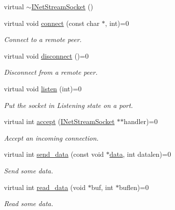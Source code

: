 \begin{DoxyCompactItemize}
\item 
virtual \hyperlink{structINetStreamSocket_a0eba64b33fce654161af0d798d821cf3}{$\sim$\+I\+Net\+Stream\+Socket} ()
\item 
virtual void \hyperlink{structINetStreamSocket_a9efb75e90465e3b182b21fb3ab856415}{connect} (const char $\ast$, int)=0
\begin{DoxyCompactList}\small\item\em Connect to a remote peer. \end{DoxyCompactList}\item 
virtual void \hyperlink{structINetStreamSocket_a902ff1a4caaab6e819e4bfae667a2108}{disconnect} ()=0
\begin{DoxyCompactList}\small\item\em Disconnect from a remote peer. \end{DoxyCompactList}\item 
virtual void \hyperlink{structINetStreamSocket_abbbe6a0061c5fcd1c5e223e2be3917ba}{listen} (int)=0
\begin{DoxyCompactList}\small\item\em Put the socket in Listening state on a port. \end{DoxyCompactList}\item 
virtual int \hyperlink{structINetStreamSocket_af2bd0b33de3a8a30f539eda297786188}{accept} (\hyperlink{structINetStreamSocket}{I\+Net\+Stream\+Socket} $\ast$$\ast$handler)=0
\begin{DoxyCompactList}\small\item\em Accept an incoming connection. \end{DoxyCompactList}\item 
virtual int \hyperlink{structINetStreamSocket_a112d5229b9dedebe7099fd4458ab28e4}{send\+\_\+data} (const void $\ast$\hyperlink{topology-example-sim_8cc_a26c65296e316af77b787dc77469bb2a4}{data}, int datalen)=0
\begin{DoxyCompactList}\small\item\em Send some data. \end{DoxyCompactList}\item 
virtual int \hyperlink{structINetStreamSocket_af040d53ef58b3b690e8930b7f71ec845}{read\+\_\+data} (void $\ast$buf, int $\ast$buflen)=0
\begin{DoxyCompactList}\small\item\em Read some data. \end{DoxyCompactList}\item 
$$
\end{DoxyCompactItemize}
